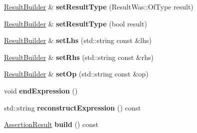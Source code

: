 \begin{DoxyCompactItemize}
\item 
\hyperlink{classCatch_1_1ResultBuilder}{Result\+Builder} \& {\bfseries set\+Result\+Type} (Result\+Was\+::\+Of\+Type result)\hypertarget{classCatch_1_1ResultBuilder_af896e372db9d7fc90ddeceff3ad110d0}{}\label{classCatch_1_1ResultBuilder_af896e372db9d7fc90ddeceff3ad110d0}

\item 
\hyperlink{classCatch_1_1ResultBuilder}{Result\+Builder} \& {\bfseries set\+Result\+Type} (bool result)\hypertarget{classCatch_1_1ResultBuilder_ae504348b073d0360bfd5fc33347ec689}{}\label{classCatch_1_1ResultBuilder_ae504348b073d0360bfd5fc33347ec689}

\item 
\hyperlink{classCatch_1_1ResultBuilder}{Result\+Builder} \& {\bfseries set\+Lhs} (std\+::string const \&lhs)\hypertarget{classCatch_1_1ResultBuilder_a5de584deec90fc6b7cc5bcf9eb636442}{}\label{classCatch_1_1ResultBuilder_a5de584deec90fc6b7cc5bcf9eb636442}

\item 
\hyperlink{classCatch_1_1ResultBuilder}{Result\+Builder} \& {\bfseries set\+Rhs} (std\+::string const \&rhs)\hypertarget{classCatch_1_1ResultBuilder_aaeb41a00cf352c7a0bcf75a0ded0a4a2}{}\label{classCatch_1_1ResultBuilder_aaeb41a00cf352c7a0bcf75a0ded0a4a2}

\item 
\hyperlink{classCatch_1_1ResultBuilder}{Result\+Builder} \& {\bfseries set\+Op} (std\+::string const \&op)\hypertarget{classCatch_1_1ResultBuilder_a8232ed051ed7f6adfbc152c98aa1dc0c}{}\label{classCatch_1_1ResultBuilder_a8232ed051ed7f6adfbc152c98aa1dc0c}

\item 
void {\bfseries end\+Expression} ()\hypertarget{classCatch_1_1ResultBuilder_a75ac2dbabd8d4b4b3a75de9bbc3abf02}{}\label{classCatch_1_1ResultBuilder_a75ac2dbabd8d4b4b3a75de9bbc3abf02}

\item 
std\+::string {\bfseries reconstruct\+Expression} () const \hypertarget{classCatch_1_1ResultBuilder_ad34bc9b83d5cbd5d960903e5a3c6c96c}{}\label{classCatch_1_1ResultBuilder_ad34bc9b83d5cbd5d960903e5a3c6c96c}

\item 
\hyperlink{classCatch_1_1AssertionResult}{Assertion\+Result} {\bfseries build} () const \hypertarget{classCatch_1_1ResultBuilder_a31eba48feb02817d2151e31bd8331eeb}{}\label{classCatch_1_1ResultBuilder_a31eba48feb02817d2151e31bd8331eeb}


\end{DoxyCompactItemize}
